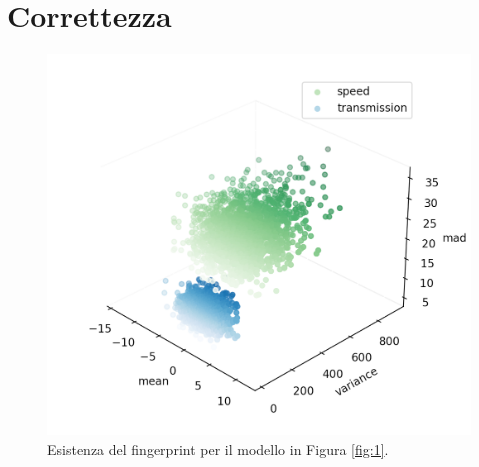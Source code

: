 \documentclass[Lau,binding=0.6cm]{sapthesis}
\begin{document}
\section{Correttezza}
\begin{figure}[t]
    \includegraphics[scale=0.6]{fingerprint.png}
    \centering
    \caption{Esistenza del fingerprint per il modello in Figura \ref{fig:1}.}
    \label{fig:3}
\end{figure}
\end{document}
